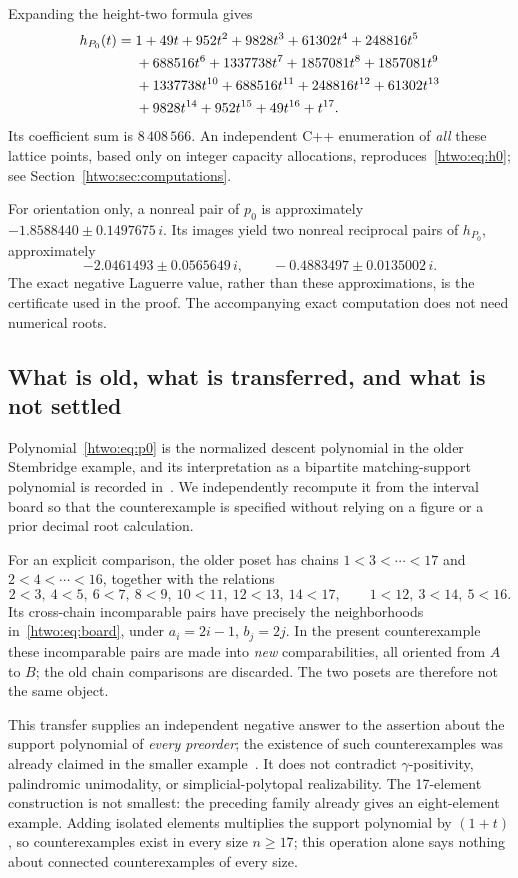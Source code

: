 \documentclass[11pt]{article}
\numberwithin{equation}{section}
\theoremstyle{definition}
\begin{document}
Expanding the height-two formula gives
\begin{align}
 h_{P_0}(t)={}&1+49t+952t^2+9828t^3+61302t^4+248816t^5\notag\\
 &+688516t^6+1337738t^7+1857081t^8+1857081t^9\notag\\
 &+1337738t^{10}+688516t^{11}+248816t^{12}+61302t^{13}\notag\\
 &+9828t^{14}+952t^{15}+49t^{16}+t^{17}.\label{htwo:eq:h0}
\end{align}
Its coefficient sum is $8\,408\,566$. An independent C++ enumeration of
\emph{all} these lattice points, based only on integer capacity allocations,
reproduces~\eqref{htwo:eq:h0}; see Section~\ref{htwo:sec:computations}.

For orientation only, a nonreal pair of $p_0$ is approximately
$-1.8588440\pm0.1497675\,i$. Its images yield two nonreal reciprocal pairs
of $h_{P_0}$, approximately
\[
 -2.0461493\pm0.0565649\,i,
 \qquad -0.4883497\pm0.0135002\,i.
\]
The exact negative Laguerre value, rather than these approximations, is
the certificate used in the proof. The accompanying exact computation does
not need numerical roots.

\subsection{What is old, what is transferred, and what is not settled}

Polynomial~\eqref{htwo:eq:p0} is the normalized descent polynomial in the older
Stembridge example, and its interpretation as a bipartite matching-support
polynomial is recorded in~\cite[Example~3.7]{OT20}. We independently
recompute it from the interval board so that the counterexample is specified
without relying on a figure or a prior decimal root calculation.

For an explicit comparison, the older poset has chains
$1<3<\cdots<17$ and $2<4<\cdots<16$, together with the relations
\[
 2<3,\ 4<5,\ 6<7,\ 8<9,\ 10<11,\ 12<13,\ 14<17,
 \qquad 1<12,\ 3<14,\ 5<16.
\]
Its cross-chain incomparable pairs have precisely the neighborhoods
in~\eqref{htwo:eq:board}, under $a_i=2i-1$, $b_j=2j$. In the present
counterexample these incomparable pairs are made into \emph{new}
comparabilities, all oriented from $A$ to $B$; the old chain comparisons
are discarded. The two posets are therefore not the same object.

This transfer supplies an independent negative answer to the assertion about
the support polynomial of \emph{every preorder}; the existence of such
counterexamples was already claimed in the smaller example~\cite{Patel}. It does not contradict
$\gamma$-positivity, palindromic unimodality, or simplicial-polytopal
realizability. The 17-element construction is not smallest: the preceding family
already gives an eight-element example. Adding isolated elements multiplies the support polynomial by
$(1+t)$, so counterexamples exist in every size $n\ge17$; this operation
alone says nothing about connected counterexamples of every size.
\end{document}
